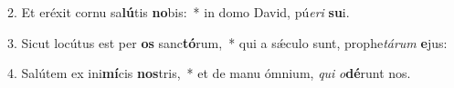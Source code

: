 
2. Et eréxit cornu sa\textbf{lú}tis \textbf{no}bis:~* in domo David, pú\textit{e}\textit{ri} \textbf{su}i.

3. Sicut locútus est per \textbf{os} sanc\textbf{tó}rum,~* qui a s\'{\ae}culo sunt, prophe\textit{tá}\textit{rum} \textbf{e}jus:

4. Salútem ex ini\textbf{mí}cis \textbf{nos}tris,~* et de manu ómnium, \textit{qui} \textit{o}\textbf{dé}runt nos.

